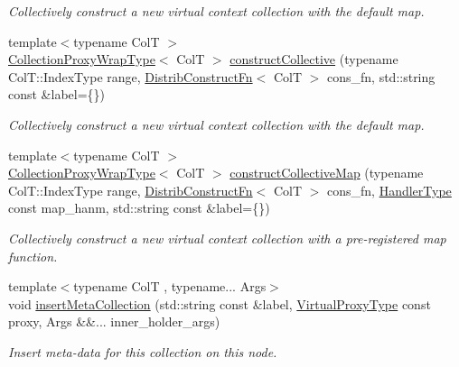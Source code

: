 \begin{DoxyCompactItemize}
\begin{DoxyCompactList}\small\item\em Collectively construct a new virtual context collection with the default map. \end{DoxyCompactList}\item 
{\footnotesize template$<$typename ColT $>$ }\\\hyperlink{structvt_1_1vrt_1_1collection_1_1_collection_manager_a56458ed7f9bb22b631b9b3a745f42f94}{Collection\+Proxy\+Wrap\+Type}$<$ ColT $>$ \hyperlink{structvt_1_1vrt_1_1collection_1_1_collection_manager_a9888879eab5c8d6d151f91aa4de0aadb}{construct\+Collective} (typename Col\+T\+::\+Index\+Type range, \hyperlink{structvt_1_1vrt_1_1collection_1_1_collection_manager_a9ef5ab71e344fdee8525c3f18241c305}{Distrib\+Construct\+Fn}$<$ ColT $>$ cons\+\_\+fn, std\+::string const \&label=\{\})
\begin{DoxyCompactList}\small\item\em Collectively construct a new virtual context collection with the default map. \end{DoxyCompactList}\item 
{\footnotesize template$<$typename ColT $>$ }\\\hyperlink{structvt_1_1vrt_1_1collection_1_1_collection_manager_a56458ed7f9bb22b631b9b3a745f42f94}{Collection\+Proxy\+Wrap\+Type}$<$ ColT $>$ \hyperlink{structvt_1_1vrt_1_1collection_1_1_collection_manager_a9b78bd325f19c36907e681e83bbd9398}{construct\+Collective\+Map} (typename Col\+T\+::\+Index\+Type range, \hyperlink{structvt_1_1vrt_1_1collection_1_1_collection_manager_a9ef5ab71e344fdee8525c3f18241c305}{Distrib\+Construct\+Fn}$<$ ColT $>$ cons\+\_\+fn, \hyperlink{namespacevt_af64846b57dfcaf104da3ef6967917573}{Handler\+Type} const map\+\_\+hanm, std\+::string const \&label=\{\})
\begin{DoxyCompactList}\small\item\em Collectively construct a new virtual context collection with a pre-\/registered map function. \end{DoxyCompactList}\item 
{\footnotesize template$<$typename ColT , typename... Args$>$ }\\void \hyperlink{structvt_1_1vrt_1_1collection_1_1_collection_manager_ac8c171d221c1c6eafe4efee35775e48b}{insert\+Meta\+Collection} (std\+::string const \&label, \hyperlink{namespacevt_a1b417dd5d684f045bb58a0ede70045ac}{Virtual\+Proxy\+Type} const proxy, Args \&\&... inner\+\_\+holder\+\_\+args)
\begin{DoxyCompactList}\small\item\em Insert meta-\/data for this collection on this node. \end{DoxyCompactList}\item 

\end{DoxyCompactItemize}
